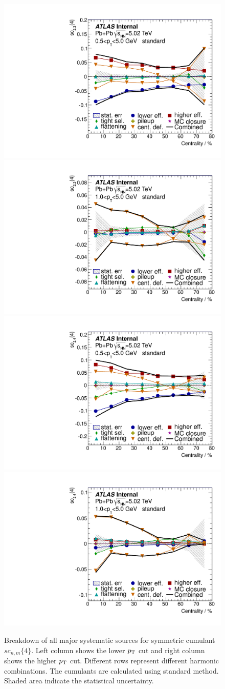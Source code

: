 \begin{figure}[H]
\centering
\includegraphics[width=.425\linewidth]{figs/chapter_appendix/sys_sc_1sub_Har2_Pt0.pdf}
\includegraphics[width=.425\linewidth]{figs/chapter_appendix/sys_sc_1sub_Har2_Pt1.pdf}
\includegraphics[width=.425\linewidth]{figs/chapter_appendix/sys_sc_1sub_Har3_Pt0.pdf}
\includegraphics[width=.425\linewidth]{figs/chapter_appendix/sys_sc_1sub_Har3_Pt1.pdf}
\caption{Breakdown of all major systematic sources for symmetric cumulant $sc_{n,m}\{4\}$. Left column shows the lower $p_\text{T}$ cut and right column shows the higher $p_\text{T}$ cut. Different rows represent different harmonic combinations. The cumulants are calculated using standard method. Shaded area indicate the statistical uncertainty.}
\end{figure}

